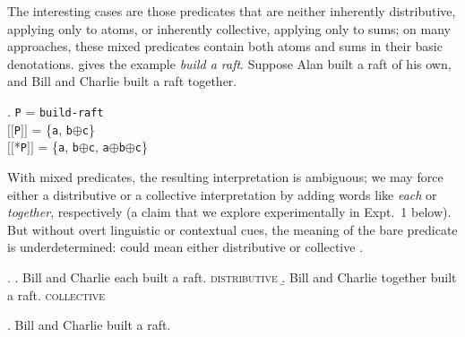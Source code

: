 \documentclass[linguex]{sp}
\newcommand{\sem}[1]{\mbox{$[\![$#1$]\!]$}}
\renewcommand{\tt}{\texttt}
\newcommand{\op}{$\oplus$}
\begin{document}

The interesting cases are those predicates that are neither inherently distributive, applying only to atoms, or inherently collective, applying only to sums; on many approaches, these mixed predicates contain both atoms and sums in their basic denotations. \citeauthor{link1983} gives the example \emph{build a raft}. Suppose Alan built a raft of his own, and Bill and Charlie built a raft together.

\ex. \tt{P} = \tt{build-raft}\\
\sem{\tt{P}} = \{\tt{a}, \tt{b}\op\tt{c}\}\\
\sem{*\tt{P}} = \{\tt{a}, \tt{b}\op\tt{c}, \tt{a}\op\tt{b}\op\tt{c}\}

With mixed predicates, the resulting interpretation is ambiguous; we may force either a distributive or a collective interpretation by adding words like \emph{each} or \emph{together}, respectively (a claim that we explore experimentally in Expt.~1 below). But without overt linguistic or contextual cues, the meaning of the bare predicate is underdetermined: \NNext could mean either distributive \Next[a] or collective \Next[b].

\ex. \a. Bill and Charlie each built a raft. \hfill \textsc{distributive}
\b. Bill and Charlie together built a raft. \hfill \textsc{collective}

\ex. Bill and Charlie built a raft.

%
%
%
%
%
%
\end{document}
